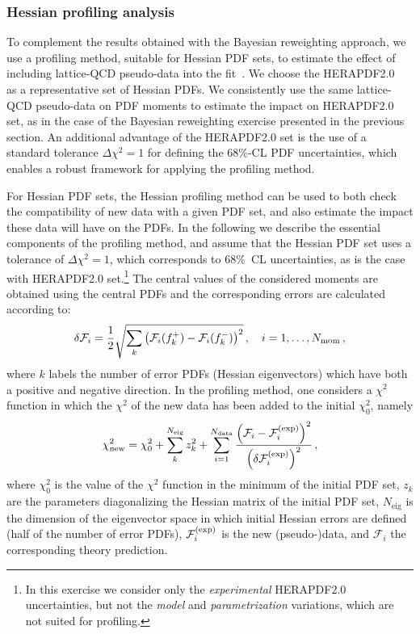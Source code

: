 \subsubsection{Hessian profiling analysis}
\label{sec:hessianprofiling}

To complement the results obtained
with the Bayesian reweighting approach,
we use a profiling method, suitable
for Hessian PDF sets, to estimate the effect of including
lattice-QCD pseudo-data into the fit~\cite{Paukkunen:2014zia,Camarda:2015zba}.
%
We
choose the HERAPDF2.0~\cite{Abramowicz:2015mha}
as a representative set of Hessian PDFs.
%
We consistently use the same lattice-QCD
pseudo-data on PDF moments to estimate the impact
on HERAPDF2.0 set, as in the case of the Bayesian reweighting
exercise presented in the previous section.
%
An additional advantage of the HERAPDF2.0 set is
the use
of a standard tolerance
$\Delta\chi^2=1$ for defining the 68\%-CL PDF
uncertainties,
which enables a robust framework for applying the profiling method. 


For Hessian PDF sets, the Hessian profiling method
can be used to both check the compatibility of new data with a given PDF set,
and also  estimate the impact these data will have on the PDFs. 
In the following we describe the essential components of the profiling method, 
and assume  that the  Hessian PDF set uses a tolerance of $\Delta\chi^2=1$, 
which corresponds to 68\%~CL uncertainties,
as is the case with HERAPDF2.0 set.\footnote{In this exercise
we consider only the {\it experimental} HERAPDF2.0
uncertainties, but not the {\it model} and {\it parametrization}
variations, which are not suited for profiling.}
%
The central values of the considered moments are obtained using the central PDFs and the corresponding
errors are calculated according to:
\begin{equation}
\delta\mathcal{F}_i = \frac{1}{2} \sqrt{\sum_{k}\left(\mathcal{F}_i(f_k^+)-\mathcal{F}_i(f_k^-)\right)^2}\, ,
\quad i=1,\ldots,N_{\rm mom} \, ,
\end{equation}
where $k$ labels the number of error PDFs (Hessian eigenvectors)
which have both a positive and negative direction.
%
In the profiling method, one considers a $\chi^2$ function in which the $\chi^2$ of the new
data has been added to the initial $\chi^2_0$, namely
\begin{equation}
\label{eq:newchi2}
\chi^2_{\text{new}} = \chi_0^2 + \sum_{k}^{N_{\text{eig}}} z_k^2
                    + \sum_{i=1}^{N_{\text{data}}}
                      \frac{\lp \mathcal{F}_i - \mathcal{F}_i^{\rm(exp)}\rp^2}
                           {\lp\delta\mathcal{F}_i^{\rm(exp)}\rp^2}\,,
\end{equation}
where $\chi^2_0$ is the value of the $\chi^2$ function in the minimum of the initial PDF set,
$z_k$ are the parameters diagonalizing the Hessian matrix of the initial PDF set,
$N_{\text{eig}}$ is the dimension of the eigenvector space in which initial Hessian errors are defined
(half of the number of error PDFs), $\mathcal{F}_i^{\rm(exp)}$ is the new
\hbox{(pseudo-)data},
and $\mathcal{F}_i$ the corresponding theory prediction.

